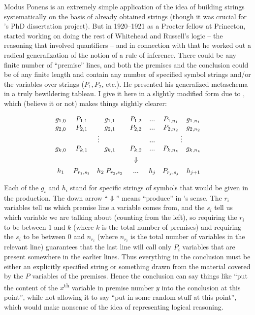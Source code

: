 \documentclass[output=paper]{langscibook}
\begin{document}
Modus Ponens is an extremely simple application of the idea of building strings systematically on the basis of already obtained strings (though it was crucial for {\Post}'s PhD dissertation project). But in 1920--1921 as a Procter fellow at Princeton, {\Post} started working on doing the rest of Whitehead and Russell's logic -- the reasoning that involved quantifiers -- and in connection with that he worked out a radical generalization of the notion of a rule of inference. There could be any finite number of ``premise'' lines, and both the premises and the conclusion could be of any finite length and contain any number of specified symbol strings and/or the variables over strings ($P_1, P_2$, etc.). He presented his generalized metaschema in a truly bewildering tableau. I give it here in a slightly modified form due to \citet{Davis82}, which (believe it or not) makes things slightly clearer:

\large 
\begin{displaymath}
\begin{array}{ccccccc} g_{1,0} & P_{1,1} & g_{1,1} & P_{1,2}  & . . . & P_{1,n_1} & g_{1,n_1} \\ g_{2,0} & P_{2,1} & g_{2,1} & P_{2,2}  & . . . & P_{2,n_2} & g_{2,n_2} \\ \multicolumn{4}{c}{\vdots}             & . . . & \multicolumn{2}{c}{\vdots} \\ g_{k,0} & P_{k,1} & g_{k,1} & P_{k,2}  & . . . & P_{k,n_k} & g_{k,n_k}\\[1ex]         &         &         &\Downarrow&       &           & \\[1ex] h_1 & P_{r_1,s_1} & h_2 \; P_{r_2,s_2} & . . . & h_j & P_{r_j,s_j} & h_{j+1} \end{array} 
\end{displaymath}
 

\normalsize\smallskip\noindent  Each of the $g_i$ and $h_i$ stand for specific strings of symbols that would be given in the production. The down arrow ``$\Downarrow$'' means ``produce'' in {\Post}'s sense. The $r_i$ variables tell us which premise line a variable comes from, and the $s_i$ tell us which variable we are talking about (counting from the left), so requiring the $r_i$ to be between 1 and $k$ (where $k$ is the total number of premises) and requiring the $s_i$ to be between 0 and $n_{r_i}$ (where $n_{r_i}$ is the total number of variables in the relevant line) guarantees that the last line will call only $P_i$ variables that are present somewhere in the earlier lines. Thus everything in the conclusion must be either an explicitly specified string or something drawn from the material covered by the $P$ variables of the premises. Hence the conclusion can say things like ``put the content of the $x$\textsuperscript{th} variable in premise number $y$ into the conclusion at this point'', while not allowing it to say ``put in some random stuff at this point'', which would make nonsense of the idea of representing logical reasoning.
\end{document}
